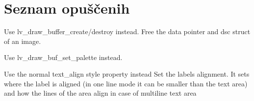 \chapter{Seznam opuščenih}
\hypertarget{deprecated}{}\label{deprecated}

\begin{DoxyRefList}
\item[Element \doxylink{lv__draw__buf_8h_a12e7feea3616993863d2255ca946db7d}{lv\+\_\+image\+\_\+buf\+\_\+free} (\doxylink{structlv__image__dsc__t}{lv\+\_\+image\+\_\+dsc\+\_\+t} \texorpdfstring{$\ast$}{*}dsc)]\label{deprecated__deprecated000003}%
%
Use lv\+\_\+draw\+\_\+buffer\+\_\+create/destroy instead. Free the data pointer and dsc struct of an image.  
\item[Element \doxylink{lv__draw__buf_8h_a48bfe11c1cb8f418faf11287330c80ec}{lv\+\_\+image\+\_\+buf\+\_\+set\+\_\+palette} (\doxylink{structlv__image__dsc__t}{lv\+\_\+image\+\_\+dsc\+\_\+t} \texorpdfstring{$\ast$}{*}dsc, uint8\+\_\+t id, \doxylink{structlv__color32__t}{lv\+\_\+color32\+\_\+t} c)]\label{deprecated__deprecated000002}%
%
Use lv\+\_\+draw\+\_\+buf\+\_\+set\+\_\+palette instead.  
\item[Element \doxylink{lv__textarea_8h_a3a131270dd523b080c9a1542f1f26b05}{lv\+\_\+textarea\+\_\+set\+\_\+align} (lv\+\_\+obj\+\_\+t \texorpdfstring{$\ast$}{*}obj, lv\+\_\+text\+\_\+align\+\_\+t align)]\label{deprecated__deprecated000004}%
%
Use the normal text\+\_\+align style property instead Set the label\textquotesingle{}s alignment. It sets where the label is aligned (in one line mode it can be smaller than the text area) and how the lines of the area align in case of multiline text area 
\end{DoxyRefList}